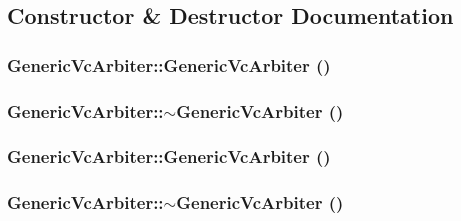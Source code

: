 \subsection{Constructor \& Destructor Documentation}
\hypertarget{classGenericVcArbiter_8ad20b81e2a38303b310d15e1dcc9947}{
\subsubsection[{GenericVcArbiter}]{\setlength{\rightskip}{0pt plus 5cm}GenericVcArbiter::GenericVcArbiter ()}}
\label{classGenericVcArbiter_8ad20b81e2a38303b310d15e1dcc9947}


\hypertarget{classGenericVcArbiter_da76ff9f227949f97ecd02d1bf89b5c8}{
\subsubsection[{$\sim$GenericVcArbiter}]{\setlength{\rightskip}{0pt plus 5cm}GenericVcArbiter::$\sim$GenericVcArbiter ()}}
\label{classGenericVcArbiter_da76ff9f227949f97ecd02d1bf89b5c8}


\hypertarget{classGenericVcArbiter_8ad20b81e2a38303b310d15e1dcc9947}{
\subsubsection[{GenericVcArbiter}]{\setlength{\rightskip}{0pt plus 5cm}GenericVcArbiter::GenericVcArbiter ()}}
\label{classGenericVcArbiter_8ad20b81e2a38303b310d15e1dcc9947}


\hypertarget{classGenericVcArbiter_da76ff9f227949f97ecd02d1bf89b5c8}{
\subsubsection[{$\sim$GenericVcArbiter}]{\setlength{\rightskip}{0pt plus 5cm}GenericVcArbiter::$\sim$GenericVcArbiter ()}}
\label{classGenericVcArbiter_da76ff9f227949f97ecd02d1bf89b5c8}




